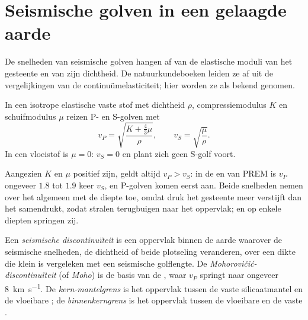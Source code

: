 \section{Seismische golven in een gelaagde aarde}

De snelheden van seismische golven hangen af van de elastische moduli van het gesteente en van zijn dichtheid. De
natuurkundeboeken leiden ze af uit de vergelijkingen van de continuümelasticiteit; hier worden ze als bekend genomen.

\begin{proposition}\label{prop:b1:layered-earth:speeds}
In een isotrope elastische vaste stof met dichtheid $\rho$, compressiemodulus $K$ en schuifmodulus
$\mu$ reizen P- en S-golven met
\[
  v_P = \sqrt{\frac{K + \tfrac43\mu}{\rho}}, \qquad v_S = \sqrt{\frac{\mu}{\rho}}.
\]
In een vloeistof is $\mu = 0$: $v_S = 0$ en plant zich geen S-golf voort.
\end{proposition}
\admitted

Aangezien $K$ en $\mu$ positief zijn, geldt altijd $v_P > v_S$: in de  en  van PREM is $v_P$ ongeveer $1.8$ tot $1.9$
keer $v_S$, en P-golven komen eerst aan. Beide snelheden nemen over het algemeen met de diepte toe, omdat druk het gesteente
meer verstijft dan het samendrukt, zodat stralen terugbuigen naar het oppervlak; en op enkele diepten springen zij.

\begin{definition}
\label{def:b1:layered-earth:discontinuity}
Een \emph{seismische discontinuïteit} is een oppervlak binnen de aarde waarover de seismische
snelheden, de dichtheid of beide plotseling veranderen, over een dikte die klein is vergeleken met een seismische golflengte. De
\emph{Mohorovičić-discontinuïteit} (of \emph{Moho}) is de basis van de , waar $v_P$
springt naar ongeveer \qty{8}{km.s^{-1}}. De \emph{kern-mantelgrens} is het oppervlak tussen de vaste silicaatmantel
en de vloeibare ; de \emph{binnenkerngrens} is het oppervlak tussen de vloeibare  en de vaste
.
\end{definition}

